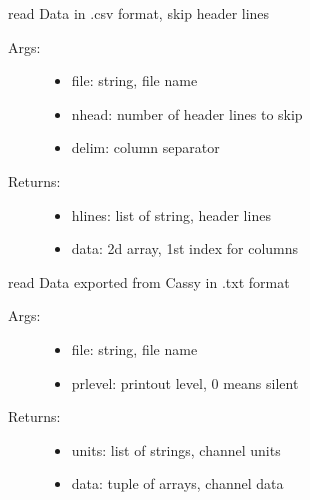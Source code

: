 \documentclass[letterpaper,10pt,english]{sphinxmanual}
\begin{document}

\begin{fulllineitems}
\label{\detokenize{index:PhyPraKit.PhyPraKit.readCSV}}
read Data in .csv format, skip header lines
\begin{description}
\item[{Args:}] \leavevmode\begin{itemize}
\item {} 
file: string, file name

\item {} 
nhead: number of header lines to skip

\item {} 
delim: column separator

\end{itemize}

\item[{Returns:}] \leavevmode\begin{itemize}
\item {} 
hlines: list of string, header lines

\item {} 
data: 2d array, 1st index for columns

\end{itemize}

\end{description}

\end{fulllineitems}


\begin{fulllineitems}
\label{\detokenize{index:PhyPraKit.PhyPraKit.readCassy}}
read Data exported from Cassy in .txt format
\begin{description}
\item[{Args:}] \leavevmode\begin{itemize}
\item {} 
file: string, file name

\item {} 
prlevel: printout level, 0 means silent

\end{itemize}

\item[{Returns:}] \leavevmode\begin{itemize}
\item {} 
units: list of strings, channel units

\item {} 
data: tuple of arrays, channel data

\end{itemize}

\end{description}

\end{fulllineitems}
\end{document}
